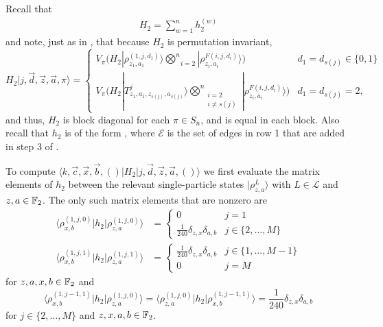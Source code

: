 \documentclass[../thesis-main/thesis-main]{subfiles}
\begin{document}
Recall that
\begin{align}
H_{2}=\sum_{w=1}^{n}h_{2}^{(w)}
\end{align}
and note, just as in , that because $H_2$ is permutation invariant, 
\begin{equation}
H_{2}|j,\vec{d},\vec{z},\vec{a},\pi\rangle=\begin{cases}
V_\pi\Big(H_{2}|\rho_{z_{1},a_{1}}^{(1,j,d_{1})}\rangle\underset{i=2}{\overset{n}{\bigotimes}}|\rho_{z_{i},a_{i}}^{F(i,j,d_{i})}\rangle\Big) & d_{1}=d_{s(j)}\in\{0,1\}\\
V_\pi\Bigg(H_{2}|T_{z_{1},a_{1},z_{s(j)},a_{s(j)}}^{j}\rangle\underset{\substack{i=2\\
i\neq s(j)
}
}{\overset{n}{\bigotimes}}|\rho_{z_{i},a_{i}}^{F(i,j,d_{i})}\rangle\Bigg) & d_{1}=d_{s(j)}=2,
\end{cases}
\label{eq:actH2}
\end{equation}
and thus, $H_2$ is block diagonal for each $\pi\in S_n$, and is equal in each block.  Also recall that $h_2$ is of the form , where $\mathcal{E}$ is the set of edges in row 1 that are added in step 3 of .

To compute $\langle k,\vec{c},\vec{x},\vec{b},()|H_{2}|j,\vec{d},\vec{z},\vec{a},()\rangle$ we first evaluate the matrix elements of $h_{2}$ between the relevant single-particle states $|\rho_{z,a}^{L}\rangle$ with $L\in\mathcal{L}$ and $z,a\in\mathbb{F}_2$. The only such matrix elements that are nonzero are
\begin{align}
\langle\rho_{x,b}^{(1,j,0)}|h_{2}|\rho_{z,a}^{(1,j,0)}\rangle&=\begin{cases}
0 & j=1\\
\frac{1}{240}\delta_{z,x}\delta_{a,b} & j\in\{2,\ldots,M\}
\end{cases}\\\langle\rho_{x,b}^{(1,j,1)}|h_{2}|\rho_{z,a}^{(1,j,1)}\rangle&=\begin{cases}
\frac{1}{240}\delta_{z,x}\delta_{a,b} & j\in\{1,\ldots,M-1\}\\
0 & j=M
\end{cases}\label{eq:diag_h2}
\end{align}
for $z,a,x,b\in\mathbb{F}_2$ and
\begin{equation}
\langle\rho_{x,b}^{(1,j-1,1)}|h_{2}|\rho_{z,a}^{(1,j,0)}\rangle=\langle\rho_{z,a}^{(1,j,0)}|h_{2}|\rho_{x,b}^{(1,j-1,1)}\rangle=\frac{1}{240}\delta_{z,x}\delta_{a,b}\label{eq:single_part_offdiag}
\end{equation}
for $j\in\{2,\ldots,M\}$ and $z,x,a,b\in\mathbb{F}_2$.
\end{document}
